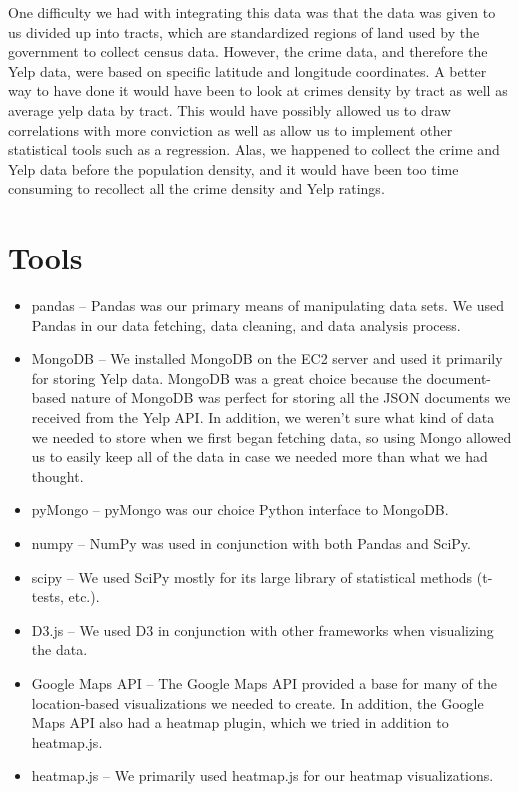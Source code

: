 \documentclass{article}
\begin{document}
One difficulty we had with integrating this data was that the data was
given to us divided up into tracts, which are standardized regions of land
used by the government to collect census data. However, the crime data, and
therefore the Yelp data, were based on specific latitude and longitude
coordinates. A better way to have done it would have been to look at crimes
density by tract as well as average yelp data by tract. This would have
possibly allowed us to draw correlations with more conviction as well as
allow us to implement other statistical tools such as a regression. Alas,
we happened to collect the crime and Yelp data before the population
density, and it would have been too time consuming to recollect all the
crime density and Yelp ratings.

\section{Tools}

\begin{itemize}
\item pandas -- Pandas was our primary means of manipulating data sets. We
  used Pandas in our data fetching, data cleaning, and data analysis
  process.
\item MongoDB -- We installed MongoDB on the EC2 server and used it
  primarily for storing Yelp data. MongoDB was a great choice because the
  document-based nature of MongoDB was perfect for storing all the JSON
  documents we received from the Yelp API. In addition, we weren't sure
  what kind of data we needed to store when we first began fetching data,
  so using Mongo allowed us to easily keep all of the data in case we
  needed more than what we had thought.
\item pyMongo -- pyMongo was our choice Python interface to MongoDB.
\item numpy -- NumPy was used in conjunction with both Pandas and SciPy.
\item scipy -- We used SciPy mostly for its large library of statistical
  methods (t-tests, etc.).
\item D3.js -- We used D3 in conjunction with other frameworks when
  visualizing the data.
\item Google Maps API -- The Google Maps API provided a base for many of
  the location-based visualizations we needed to create. In addition, the
  Google Maps API also had a heatmap plugin, which we tried in addition to
  heatmap.js.
\item heatmap.js -- We primarily used heatmap.js for our heatmap
  visualizations.
\end{itemize}
\end{document}
